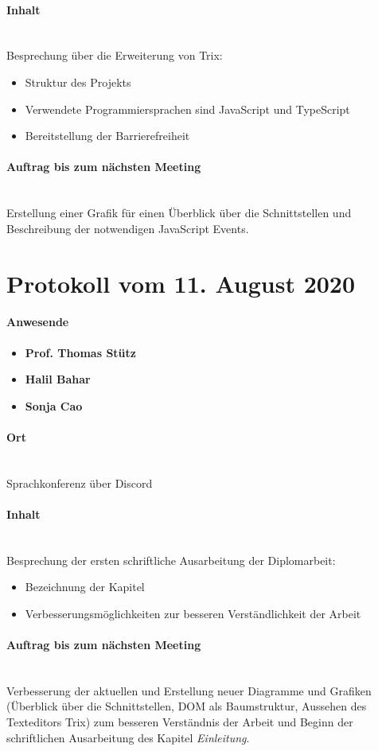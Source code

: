 \paragraph{Inhalt}\mbox{}\\
Besprechung über die Erweiterung von Trix:
\begin{itemize}
	\item{Struktur des Projekts}
	\item{Verwendete Programmiersprachen sind JavaScript und TypeScript}
	\item{Bereitstellung der Barrierefreiheit}
\end{itemize}

\paragraph{Auftrag bis zum nächsten Meeting}\mbox{}\\
Erstellung einer Grafik für einen Überblick über die Schnittstellen und Beschreibung der notwendigen JavaScript Events.

\section{Protokoll vom 11. August 2020}

\paragraph{Anwesende}
\begin{itemize}
	\item{\textbf{Prof. Thomas Stütz}}
	\item{\textbf{Halil Bahar}}
	\item{\textbf{Sonja Cao}}
\end{itemize}

\paragraph{Ort}\mbox{}\\
Sprachkonferenz über Discord

\paragraph{Inhalt}\mbox{}\\
Besprechung der ersten schriftliche Ausarbeitung der Diplomarbeit:
\begin{itemize}
	\item{Bezeichnung der Kapitel}
	\item{Verbesserungsmöglichkeiten zur besseren Verständlichkeit der Arbeit}
\end{itemize}

\paragraph{Auftrag bis zum nächsten Meeting}\mbox{}\\
Verbesserung der aktuellen und Erstellung neuer Diagramme und Grafiken (Überblick über die Schnittstellen, DOM als Baumstruktur, Aussehen des Texteditors Trix) zum besseren Verständnis der Arbeit und Beginn der schriftlichen Ausarbeitung des Kapitel {\em{Einleitung}}.